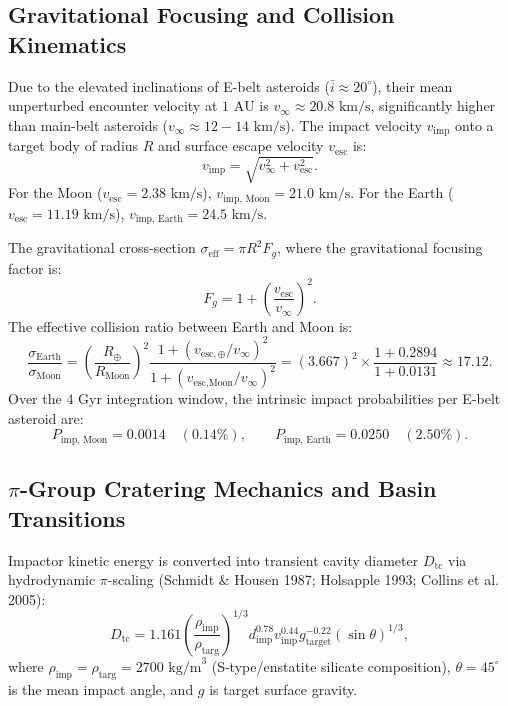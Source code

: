 \documentclass[11pt,a4paper]{article}
\begin{document}
\subsection{Gravitational Focusing and Collision Kinematics}
Due to the elevated inclinations of E-belt asteroids ($\bar{i} \approx 20^\circ$), their mean unperturbed encounter velocity at $1\text{ AU}$ is $v_\infty \approx 20.8\text{ km/s}$, significantly higher than main-belt asteroids ($v_\infty \approx 12-14\text{ km/s}$). The impact velocity $v_{\text{imp}}$ onto a target body of radius $R$ and surface escape velocity $v_{\text{esc}}$ is:
\begin{equation}
v_{\text{imp}} = \sqrt{v_\infty^2 + v_{\text{esc}}^2}.
\end{equation}
For the Moon ($v_{\text{esc}} = 2.38\text{ km/s}$), $v_{\text{imp, Moon}} = 21.0\text{ km/s}$. For the Earth ($v_{\text{esc}} = 11.19\text{ km/s}$), $v_{\text{imp, Earth}} = 24.5\text{ km/s}$.

The gravitational cross-section $\sigma_{\text{eff}} = \pi R^2 F_g$, where the gravitational focusing factor is:
\begin{equation}
F_g = 1 + \left(\frac{v_{\text{esc}}}{v_\infty}\right)^2.
\end{equation}
The effective collision ratio between Earth and Moon is:
\begin{equation}
\frac{\sigma_{\text{Earth}}}{\sigma_{\text{Moon}}} = \left(\frac{R_\oplus}{R_{\text{Moon}}}\right)^2 \frac{1 + (v_{\text{esc},\oplus} / v_\infty)^2}{1 + (v_{\text{esc,Moon}} / v_\infty)^2} = (3.667)^2 \times \frac{1 + 0.2894}{1 + 0.0131} \approx 17.12.
\end{equation}
Over the $4\text{ Gyr}$ integration window, the intrinsic impact probabilities per E-belt asteroid are:
\begin{equation}
P_{\text{imp, Moon}} = 0.0014 \quad (0.14\%), \qquad P_{\text{imp, Earth}} = 0.0250 \quad (2.50\%).
\end{equation}

\subsection{\texorpdfstring{$\pi$}{Pi}-Group Cratering Mechanics and Basin Transitions}
Impactor kinetic energy is converted into transient cavity diameter $D_{\text{tc}}$ via hydrodynamic $\pi$-scaling (Schmidt \& Housen 1987; Holsapple 1993; Collins et al. 2005):
\begin{equation}
D_{\text{tc}} = 1.161 \left(\frac{\rho_{\text{imp}}}{\rho_{\text{targ}}}\right)^{1/3} d_{\text{imp}}^{0.78} v_{\text{imp}}^{0.44} g_{\text{target}}^{-0.22} (\sin \theta)^{1/3},
\end{equation}
where $\rho_{\text{imp}} = \rho_{\text{targ}} = 2700\text{ kg/m}^3$ (S-type/enstatite silicate composition), $\theta = 45^\circ$ is the mean impact angle, and $g$ is target surface gravity.
\end{document}

